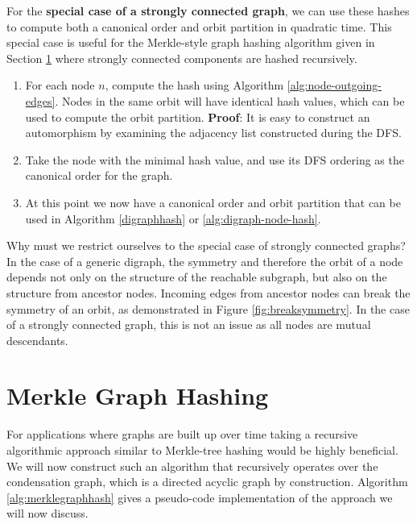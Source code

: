 \documentclass[twoside,leqno]{article}
\begin{document}
For the \textbf{special case of a strongly connected graph}, we can use these hashes to compute both a canonical order and orbit partition in quadratic time. This special case is useful for the Merkle-style graph hashing algorithm given in Section \ref{sec:merkle-graph-hashing} where strongly connected components are hashed recursively.

\begin{algorithm}[H]
    \caption{Canonization and Orbit Partitioning for Strongly Connected Outgoing Ordered Edge Graphs}
    \label{alg:scc-outgoing-edges}
    \begin{enumerate}
        \item For each node $n$, compute the hash using Algorithm \ref{alg:node-outgoing-edges}. Nodes in the same orbit will have identical hash values, which can be used to compute the orbit partition. \textbf{Proof}: It is easy to construct an automorphism by examining the adjacency list constructed during the DFS.
        \item Take the node with the minimal hash value, and use its DFS ordering as the canonical order for the graph.
        \item At this point we now have a canonical order and orbit partition that can be used in Algorithm \ref{digraphhash} or \ref{alg:digraph-node-hash}.
    \end{enumerate}
\end{algorithm}

Why must we restrict ourselves to the special case of strongly connected graphs? In the case of a generic digraph, the symmetry and therefore the orbit of a node depends not only on the structure of the reachable subgraph, but also on the structure from ancestor nodes. Incoming edges from ancestor nodes can break the symmetry of an orbit, as demonstrated in Figure \ref{fig:breaksymmetry}. In the case of a strongly connected graph, this is not an issue as all nodes are mutual descendants.

\section{Merkle Graph Hashing}
\label{sec:merkle-graph-hashing}

For applications where graphs are built up over time taking a recursive algorithmic approach similar to Merkle-tree hashing would be highly beneficial. We will now construct such an algorithm that recursively operates over the condensation graph, which is a directed acyclic graph by construction. Algorithm \ref{alg:merklegraphhash} gives a pseudo-code implementation of the approach we will now discuss.
\end{document}
